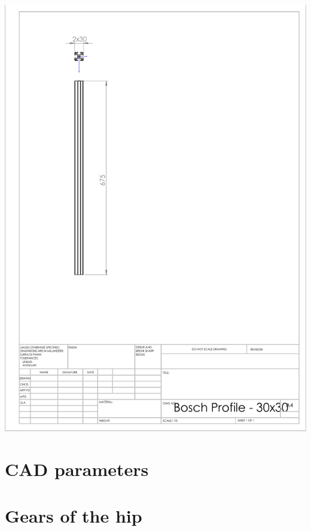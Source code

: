 \begin{appendices}
        \includegraphics[width=\linewidth]{chapters/cha_appendices/bosch_profile}

    \section{CAD parameters}
    \label{app:cad_parameters}
        

    \section{Gears of the hip}
    \label{app:hip_gears}
        
\end{appendices}